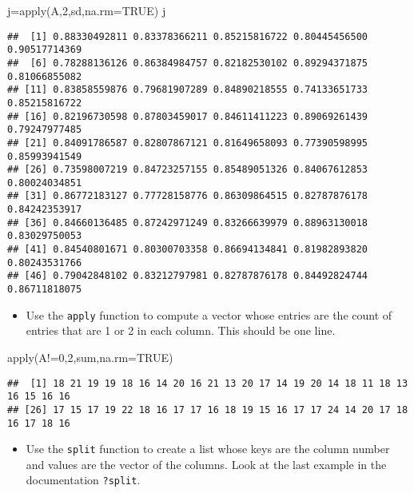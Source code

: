 \documentclass[
]{article}
\newenvironment{Shaded}{\begin{snugshade}}{\end{snugshade}}
\newcommand{\AttributeTok}[1]{\textcolor[rgb]{0.77,0.63,0.00}{#1}}
\newcommand{\ConstantTok}[1]{\textcolor[rgb]{0.00,0.00,0.00}{#1}}
\newcommand{\DecValTok}[1]{\textcolor[rgb]{0.00,0.00,0.81}{#1}}
\newcommand{\FunctionTok}[1]{\textcolor[rgb]{0.00,0.00,0.00}{#1}}
\newcommand{\NormalTok}[1]{#1}
\newcommand{\OtherTok}[1]{\textcolor[rgb]{0.56,0.35,0.01}{#1}}
\newcommand{\SpecialCharTok}[1]{\textcolor[rgb]{0.00,0.00,0.00}{#1}}
\providecommand{\tightlist}{%
  \setlength{\itemsep}{0pt}\setlength{\parskip}{0pt}}
\begin{document}
\begin{Shaded}
\begin{Highlighting}[]
\NormalTok{j}\OtherTok{=}\FunctionTok{apply}\NormalTok{(A,}\DecValTok{2}\NormalTok{,sd,}\AttributeTok{na.rm=}\ConstantTok{TRUE}\NormalTok{)}
\NormalTok{j}
\end{Highlighting}
\end{Shaded}

\begin{verbatim}
##  [1] 0.88330492811 0.83378366211 0.85215816722 0.80445456500 0.90517714369
##  [6] 0.78288136126 0.86384984757 0.82182530102 0.89294371875 0.81066855082
## [11] 0.83858559876 0.79681907289 0.84890218555 0.74133651733 0.85215816722
## [16] 0.82196730598 0.87803459017 0.84611411223 0.89069261439 0.79247977485
## [21] 0.84091786587 0.82807867121 0.81649658093 0.77390598995 0.85993941549
## [26] 0.73598007219 0.84723257155 0.85489051326 0.84067612853 0.80024034851
## [31] 0.86772183127 0.77728158776 0.86309864515 0.82787876178 0.84242353917
## [36] 0.84660136485 0.87242971249 0.83266639979 0.88963130018 0.83029750053
## [41] 0.84540801671 0.80300703358 0.86694134841 0.81982893820 0.80243531766
## [46] 0.79042848102 0.83212797981 0.82787876178 0.84492824744 0.86711818075
\end{verbatim}

\begin{itemize}
\tightlist
\item
  Use the \texttt{apply} function to compute a vector whose entries are
  the count of entries that are 1 or 2 in each column. This should be
  one line.
\end{itemize}

\begin{Shaded}
\begin{Highlighting}[]
\FunctionTok{apply}\NormalTok{(A}\SpecialCharTok{!=}\DecValTok{0}\NormalTok{,}\DecValTok{2}\NormalTok{,sum,}\AttributeTok{na.rm=}\ConstantTok{TRUE}\NormalTok{)}
\end{Highlighting}
\end{Shaded}

\begin{verbatim}
##  [1] 18 21 19 19 18 16 14 20 16 21 13 20 17 14 19 20 14 18 11 18 13 16 15 16 16
## [26] 17 15 17 19 22 18 16 17 17 16 18 19 15 16 17 17 24 14 20 17 18 16 17 18 16
\end{verbatim}

\begin{itemize}
\tightlist
\item
  Use the \texttt{split} function to create a list whose keys are the
  column number and values are the vector of the columns. Look at the
  last example in the documentation \texttt{?split}.
\end{itemize}
\end{document}
